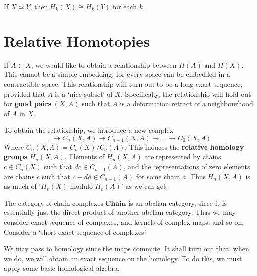 \begin{corollary}
    If $X \simeq Y$, then $H_k(X) \cong H_k(Y)$ for each $k$.
\end{corollary}


\section{Relative Homotopies}

If $A \subset X$, we would like to obtain a relationship between $H(A)$ and $H(X)$. This cannot be a simple embedding, for every space can be embedded in a contractible space. This relationship will turn out to be a long exact sequence, provided that $A$ is a `nice subset' of $X$. Specifically, the relationship  will hold out for {\bf good pairs} $(X,A)$ such that $A$ is a deformation retract of a neighbourhood of $A$ in $X$.

To obtain the relationship, we introduce a new complex
%
\[ \dots \xrightarrow{} C_n(X,A) \xrightarrow{} C_{n-1}(X,A) \xrightarrow{} \dots \xrightarrow{} C_0(X,A) \]
%
Where $C_n(X,A) = C_n(X) / C_n(A)$. This induces the {\bf relative homology groups} $H_n(X,A)$. Elements of $H_n(X,A)$ are represented by chains $c \in C_n(X)$ such that $dc \in C_{n-1}(A)$, and the representations of zero elements are chains $c$ such that $c - da \in C_{n-1}(A)$ for some chain $a$. Thus $H_n(X,A)$ is as much of `$H_n(X)$ modulo $H_n(A)$' as we can get.

The category of chain complexes $\textbf{Chain}$ is an abelian category, since it is essentially just the direct product of another abelian category. Thus we may consider exact sequence of complexes, and kernels of complex maps, and so on. Consider a `short exact sequence of complexes'
%
\begin{center}
\end{center}
%
We may pass to homology since the maps commute. It shall turn out that, when we do, we will obtain an exact sequence on the homology. To do this, we must apply some basic homological algebra.

